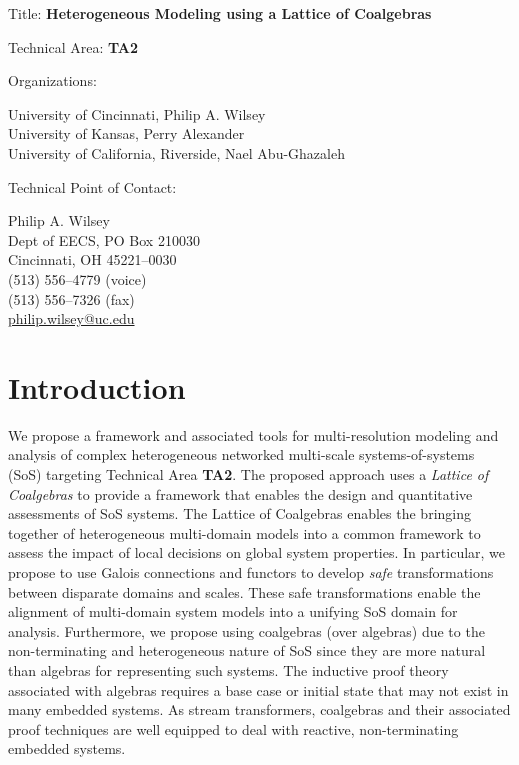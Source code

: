 \documentclass[12pt]{article}
\begin{document}
\noindent
{\Large Title: \textbf{Heterogeneous Modeling using a Lattice of Coalgebras}}

\bigskip
\bigskip
\bigskip
\bigskip
\bigskip

\noindent
Technical Area: \textbf{TA2}

\bigskip
\bigskip
\bigskip
\bigskip

\noindent
Organizations: \begin{minipage}[t]{4in}
  \textsf{University of Cincinnati, Philip A. Wilsey} \\
  \textsf{University of Kansas, Perry Alexander} \\
  \textsf{University of California, Riverside, Nael Abu-Ghazaleh}
\end{minipage}

\bigskip
\bigskip
\bigskip
\bigskip

\noindent
Technical Point of Contact: \begin{minipage}[t]{4in}
  Philip A. Wilsey \\
  Dept of EECS, PO Box 210030 \\
  Cincinnati, OH 45221--0030 \\
  (513) 556--4779 (voice) \\
  (513) 556--7326 (fax) \\
  \url{philip.wilsey@uc.edu}
\end{minipage}

\clearpage

\section{Introduction}

We propose a framework and associated tools for multi-resolution
modeling and analysis of complex heterogeneous networked multi-scale
systems-of-systems (SoS) targeting Technical Area \textbf{TA2}.  The
proposed approach uses a \emph{Lattice of Coalgebras} to provide a
framework that enables the design and quantitative assessments of SoS
systems.  The Lattice of Coalgebras enables the bringing together of
heterogeneous multi-domain models into a common framework to assess
the impact of local decisions on global system properties.  In
particular, we propose to use Galois connections and functors to
develop \emph{safe} transformations between disparate domains and
scales.  These safe transformations enable the alignment of
multi-domain system models into a unifying SoS domain for analysis.
Furthermore, we propose using coalgebras (over algebras) due to the
non-terminating and heterogeneous nature of SoS since they are more
natural than algebras for representing such systems.  The inductive
proof theory associated with algebras requires a base case or initial
state that may not exist in many embedded systems.  As stream
transformers, coalgebras and their associated proof techniques are
well equipped to deal with reactive, non-terminating embedded systems.
\end{document}
